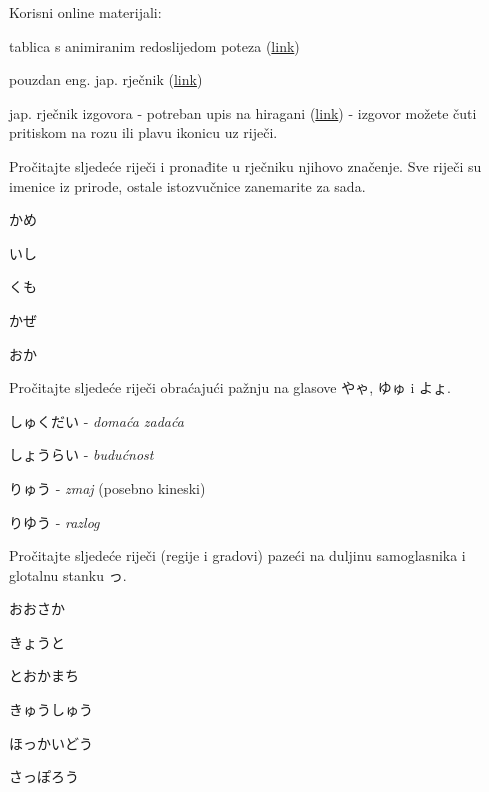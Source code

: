 
\author{autor}

	
	Korisni online materijali:
	\begin{hyou}
		\item tablica s animiranim redoslijedom poteza (\href{https://yosida.com/en/hiragana.html}{link})
		\item pouzdan eng. jap. rječnik (\href{https://jisho.org/}{link})
		\item jap. rječnik izgovora - potreban upis na hiragani (\href{http://www.gavo.t.u-tokyo.ac.jp/ojad/eng/search/index}{link}) - izgovor možete čuti pritiskom na rozu ili plavu ikonicu uz riječi.
	\end{hyou}
	
	\begin{mondai}{Pročitajte sljedeće riječi i pronađite u rječniku njihovo značenje. Sve riječi su imenice iz prirode, ostale istozvučnice zanemarite za sada.}
		\item かめ
		\item いし
		\item くも
		\item かぜ
		\item おか
	\end{mondai}

	\begin{mondai}{Pročitajte sljedeće riječi obraćajući pažnju na glasove やゃ, ゆゅ i よょ.}
		\item しゅくだい - \textit{domaća zadaća}
		\item しょうらい - \textit{budućnost}
		\item りゅう - \textit{zmaj} (posebno kineski)
		\item りゆう - \textit{razlog}
	\end{mondai}

	\begin{mondai}{Pročitajte sljedeće riječi (regije i gradovi) pazeći na duljinu samoglasnika i glotalnu stanku っ.}
		\item おおさか
		\item きょうと
		\item とおかまち
		\item きゅうしゅう
		\item ほっかいどう
		\item さっぽろう
	\end{mondai}

